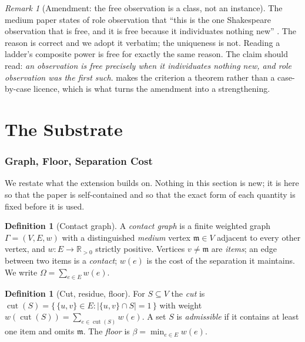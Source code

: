 \documentclass[11pt,twocolumn,a4paper]{article}
\theoremstyle{plain}
\theoremstyle{definition}
\newtheorem{definition}[theorem]{Definition}
\theoremstyle{remark}
\newtheorem{remark}[theorem]{Remark}
\newcommand{\Rpos}{\mathbb{R}_{>0}}
\newcommand{\Gph}{\Gamma}
\newcommand{\med}{\mathfrak{m}}
\newcommand{\cut}{\operatorname{cut}}
\newcommand{\wt}{w}
\newcommand{\flo}{\beta}
\newcommand{\Tot}{\Omega}
\newcommand{\abs}[1]{\left|#1\right|}
\begin{document}
\begin{remark}[Amendment: the free observation is a class, not an instance]
\label{rem:amend-free}
The medium paper states of role observation that ``this is the one Shakespeare
observation that is free, and it is free because it individuates nothing new''
\citep{sachikonye2026medium}. The reason is correct and we adopt it verbatim;
the uniqueness is not. Reading a ladder's composite power is free for exactly
the same reason. The claim should read: \emph{an observation is free precisely
when it individuates nothing new, and role observation was the first such}.
 makes the criterion a theorem rather than a case-by-case
licence, which is what turns the amendment into a strengthening.
\end{remark}

\part{The Substrate}
\label{part:substrate}

\section{Graph, Floor, Separation Cost}
\label{sec:substrate}

We restate what the extension builds on. Nothing in this section is new; it is
here so that the paper is self-contained and so that the exact form of each
quantity is fixed before it is used.

\begin{definition}[Contact graph]
\label{def:graph}
A \emph{contact graph} is a finite weighted graph $\Gph=(V,E,\wt)$ with a
distinguished \emph{medium} vertex $\med\in V$ adjacent to every other vertex,
and $\wt:E\to\Rpos$ strictly positive. Vertices $v\neq\med$ are \emph{items};
an edge between two items is a \emph{contact}; $\wt(e)$ is the cost of the
separation it maintains. We write $\Tot=\sum_{e\in E}\wt(e)$.
\end{definition}

\begin{definition}[Cut, residue, floor]
\label{def:cut}
For $S\subseteq V$ the \emph{cut} is
$\cut(S)=\{\,\{u,v\}\in E : \abs{\{u,v\}\cap S}=1\,\}$ with weight
$\wt(\cut(S))=\sum_{e\in\cut(S)}\wt(e)$. A set $S$ is \emph{admissible} if it
contains at least one item and omits $\med$. The \emph{floor} is
$\flo=\min_{e\in E}\wt(e)$.
\end{definition}
\end{document}
